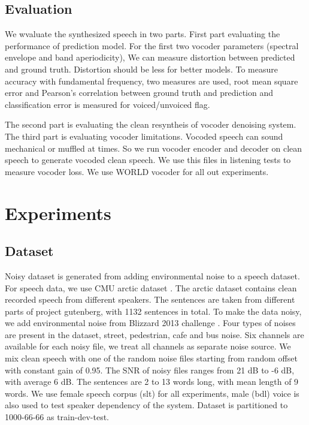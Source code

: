 \documentclass{article}
\begin{document}
\subsection{Evaluation}
\label{sec:evaluation}
We wvaluate the synthesized speech in two parts. First part evaluating the performance of prediction model. For the first two vocoder parameters (spectral envelope and band aperiodicity), We can measure distortion between predicted and ground truth. Distortion should be less for better models. To measure accuracy with fundamental frequency, two measures are used, root mean square error and Pearson's correlation between ground truth and prediction and classification error is measured for voiced/unvoiced flag. 

The second part is evaluating the clean resyntheis of vocoder denoising system.
The third part is evaluating vocoder limitations. Vocoded speech can sound mechanical or muffled at times. So we run vocoder encoder and decoder on clean speech to generate vocoded clean speech. We use this files in listening tests to measure vocoder loss. We use WORLD vocoder for all out experiments.

\section{Experiments}
\label{sec:expr}

\subsection{Dataset}
\label{ssec:data}
Noisy dataset is generated from adding environmental noise to a speech dataset. For speech data, we use CMU arctic dataset \cite{kominek2004cmu}. The arctic dataset contains clean recorded speech from different speakers. The sentences are taken from different parts of project gutenberg, with 1132 sentences in total. To make the data noisy, we add environmental noise from Blizzard 2013 challenge \cite{KingAndKaraiskos2013}. Four types of noises are present in the dataset, street, pedestrian, cafe and bus noise. Six channels are available for each noisy file, we treat all channels as separate noise source. We mix clean speech with one of the random noise files starting from random offset with constant gain of 0.95. The SNR of noisy files ranges from 21 dB to -6 dB, with average 6 dB. The sentences are 2 to 13 words long, with mean length of 9 words. We use female speech corpus (slt) for all experiments, male (bdl) voice is also used to test speaker dependency of the system. Dataset is partitioned to 1000-66-66 as train-dev-test. 
 
\end{document}
